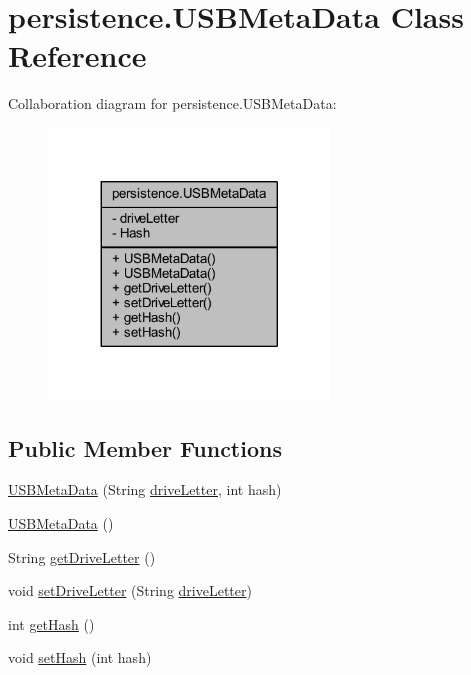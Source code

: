 \hypertarget{classpersistence_1_1_u_s_b_meta_data}{}\section{persistence.\+U\+S\+B\+Meta\+Data Class Reference}
\label{classpersistence_1_1_u_s_b_meta_data}


Collaboration diagram for persistence.\+U\+S\+B\+Meta\+Data\+:\nopagebreak
\begin{figure}[H]
\begin{center}
\leavevmode
\includegraphics[width=212pt]{classpersistence_1_1_u_s_b_meta_data__coll__graph}
\end{center}
\end{figure}
\subsection*{Public Member Functions}
\begin{DoxyCompactItemize}
\item 
\mbox{\hyperlink{classpersistence_1_1_u_s_b_meta_data_afc6faf24dc686ad216f678947528bc21}{U\+S\+B\+Meta\+Data}} (String \mbox{\hyperlink{classpersistence_1_1_u_s_b_meta_data_a4a566816eb5a831dda4b8c153891480f}{drive\+Letter}}, int hash)
\item 
\mbox{\hyperlink{classpersistence_1_1_u_s_b_meta_data_a6d71c1d72066d41fe7fc2c7d26cde11d}{U\+S\+B\+Meta\+Data}} ()
\item 
String \mbox{\hyperlink{classpersistence_1_1_u_s_b_meta_data_aa97eefbccd3be987bcf723cd44417702}{get\+Drive\+Letter}} ()
\item 
void \mbox{\hyperlink{classpersistence_1_1_u_s_b_meta_data_a099a9eae161a5cb63fb48ef67d4861bf}{set\+Drive\+Letter}} (String \mbox{\hyperlink{classpersistence_1_1_u_s_b_meta_data_a4a566816eb5a831dda4b8c153891480f}{drive\+Letter}})
\item 
int \mbox{\hyperlink{classpersistence_1_1_u_s_b_meta_data_a09b0467c48f21bc5bb6e6da65f929ae5}{get\+Hash}} ()
\item 
void \mbox{\hyperlink{classpersistence_1_1_u_s_b_meta_data_ad0d7cd79038aeadfd2c66482c2bab8b3}{set\+Hash}} (int hash)
\end{DoxyCompactItemize}
